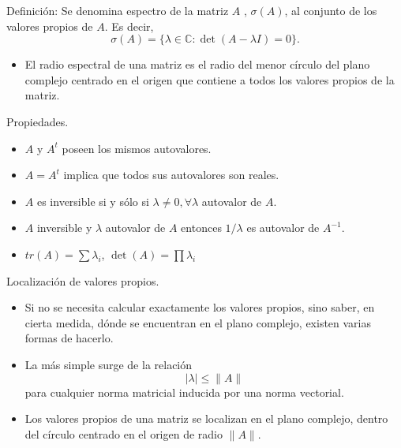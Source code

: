 \documentclass[11pt]{beamer}
\begin{document}
\begin{frame}
  \begin{block}{Definici\'on:}
     Se denomina espectro de la matriz $A$ , $\sigma(A)$, al conjunto de
  los valores propios de $A$. Es decir,
  $$
  \sigma(A) = \{\lambda \in \mathbb{C}: \det(A - \lambda I) = 0\}.
  $$
  \end{block}
  \begin{itemize}
     \item<3-> El radio espectral de una matriz es el radio del menor c\'irculo del plano complejo centrado en el origen que contiene a todos los valores propios de la matriz.
  \end{itemize}
  \end{frame}
\begin{frame}{Propiedades.}
  \begin{itemize}
     \item<1-> $A$ y $A^t$ poseen los mismos autovalores.
  \item<2-> $A=A^t$ implica  que todos sus autovalores son reales.
  \item<3-> $A$ es inversible si y s\'olo si $\lambda \neq 0, \forall \lambda$ autovalor de $A$.
  \item<4-> $A$ inversible  y $\lambda$ autovalor de $A$ entonces $1/\lambda$ es autovalor de $A^{-1}$.
  \item<5-> $tr(A) = \sum\lambda_i$, $\det(A) = \prod \lambda_i$
  \end{itemize}
  \end{frame}
  \begin{frame}{Localizaci\'on de valores propios.}
    \begin{itemize}
       \item Si no se necesita calcular exactamente los valores propios, sino saber, en cierta medida,  
    d\'onde se encuentran en el plano complejo, existen varias formas de hacerlo.
    \item<2->  La m\'as simple surge de la relaci\'on
    $$
    |\lambda| \leq \|A\|
    $$
    para cualquier norma matricial inducida por una norma vectorial.
    \item<3-> Los valores propios de una matriz se localizan en el plano
    complejo, dentro del c\'irculo centrado en el origen de radio $\|A\|$.
    \end{itemize}
    \end{frame}
\end{document}
